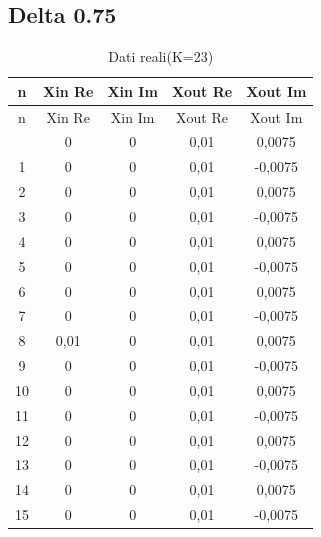 \documentclass[a4paper, titlepage]{article}
\begin{document}
\subsection{Delta 0.75} \label{tab:delta075}
\begin{longtable}{*5c}
\caption{Dati reali(K=23)}
\label{}\\
\toprule
n & Xin Re & Xin Im & Xout Re & Xout Im \\
\midrule
\endfirsthead
n & Xin Re & Xin Im & Xout Re & Xout Im \\
\midrule
\endhead
\midrule
\endfoot
\bottomrule
\endlastfoot
0 & 0 & 0 & 0,01 & 0,0075\\
1 & 0   & 0 & 0,01 & -0,0075 \\
2 & 0    & 0 & 0,01 & 0,0075 \\
3 & 0    & 0 & 0,01 & -0,0075 \\
4 & 0    & 0 & 0,01 & 0,0075 \\
5 & 0    & 0 & 0,01 & -0,0075 \\
6 & 0    & 0 & 0,01 & 0,0075 \\
7 & 0    & 0 & 0,01 & -0,0075 \\
8 & 0,01    & 0 & 0,01 & 0,0075 \\
9 & 0    & 0 & 0,01 & -0,0075 \\
10& 0    & 0 & 0,01 & 0,0075 \\
11& 0    & 0 & 0,01 & -0,0075 \\
12& 0    & 0 & 0,01 & 0,0075 \\
13& 0    & 0 & 0,01 & -0,0075 \\
14& 0    & 0 & 0,01 & 0,0075 \\
15 & 0 & 0 & 0,01 & -0,0075 \\ 
\end{longtable}
\end{document}
